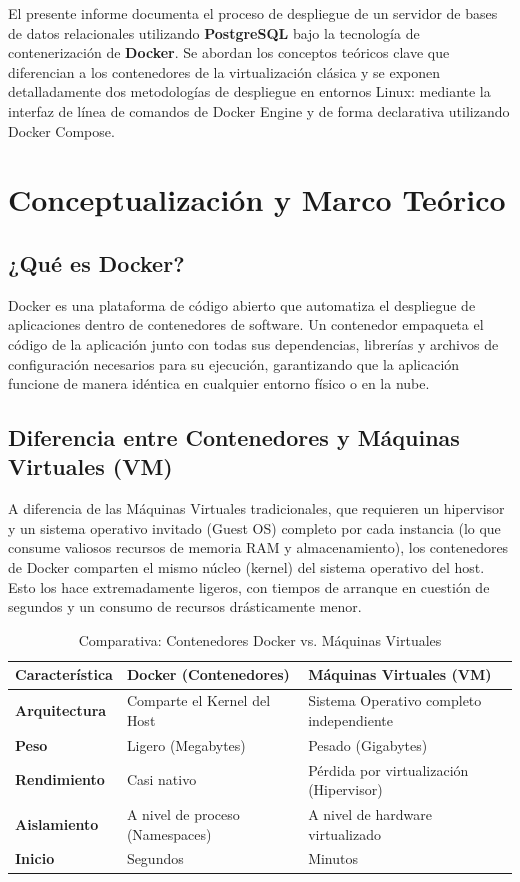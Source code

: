 \documentclass[12pt, doc]{apa7} %
\begin{document}
	El presente informe documenta el proceso de despliegue de un servidor de bases de datos relacionales utilizando \textbf{PostgreSQL} bajo la tecnología de contenerización de \textbf{Docker}. Se abordan los conceptos teóricos clave que diferencian a los contenedores de la virtualización clásica y se exponen detalladamente dos metodologías de despliegue en entornos Linux: mediante la interfaz de línea de comandos de Docker Engine y de forma declarativa utilizando Docker Compose.
	
	\section{Conceptualización y Marco Teórico}
	
	\subsection{¿Qué es Docker?}
	Docker es una plataforma de código abierto que automatiza el despliegue de aplicaciones dentro de contenedores de software. Un contenedor empaqueta el código de la aplicación junto con todas sus dependencias, librerías y archivos de configuración necesarios para su ejecución, garantizando que la aplicación funcione de manera idéntica en cualquier entorno físico o en la nube.
	
	\subsection{Diferencia entre Contenedores y Máquinas Virtuales (VM)}
	A diferencia de las Máquinas Virtuales tradicionales, que requieren un hipervisor y un sistema operativo invitado (Guest OS) completo por cada instancia (lo que consume valiosos recursos de memoria RAM y almacenamiento), los contenedores de Docker comparten el mismo núcleo (kernel) del sistema operativo del host. Esto los hace extremadamente ligeros, con tiempos de arranque en cuestión de segundos y un consumo de recursos drásticamente menor.
	
	\begin{table}[h!]
		\centering
		\caption{Comparativa: Contenedores Docker vs. Máquinas Virtuales}
		\vspace{0.2cm}
		\begin{tabular}{lll}
			\toprule
			\textbf{Característica} & \textbf{Docker (Contenedores)} & \textbf{Máquinas Virtuales (VM)} \\
			\midrule
			\textbf{Arquitectura} & Comparte el Kernel del Host & Sistema Operativo completo independiente \\
			\textbf{Peso} & Ligero (Megabytes) & Pesado (Gigabytes) \\
			\textbf{Rendimiento} & Casi nativo & Pérdida por virtualización (Hipervisor) \\
			\textbf{Aislamiento} & A nivel de proceso (Namespaces) & A nivel de hardware virtualizado \\
			\textbf{Inicio} & Segundos & Minutos \\
			\bottomrule
		\end{tabular}
	\end{table}
	
\end{document}
